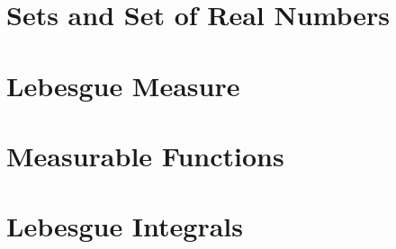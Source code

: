 \documentclass{report}
\begin{document}
	
	\thispagestyle{empty}
	\newpage%
	\tableofcontents
  
  \chapter{Sets and Set of Real Numbers}
  
  \chapter{Lebesgue Measure}
  
  \chapter{Measurable Functions}
  
  \chapter{Lebesgue Integrals}
  
  
\end{document}
